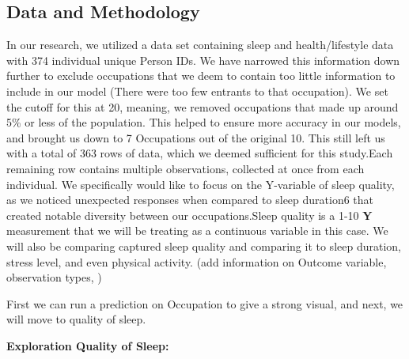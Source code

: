 \documentclass[
  letterpaper,
  DIV=11,
  numbers=noendperiod]{scrartcl}
\begin{document}
\subsection{Data and Methodology}\label{data-and-methodology}

In our research, we utilized a data set containing sleep and
health/lifestyle data with 374 individual unique Person IDs. We have
narrowed this information down further to exclude occupations that we
deem to contain too little information to include in our model (There
were too few entrants to that occupation). We set the cutoff for this at
20, meaning, we removed occupations that made up around 5\% or less of
the population. This helped to ensure more accuracy in our models, and
brought us down to 7 Occupations out of the original 10. This still left
us with a total of 363 rows of data, which we deemed sufficient for this
study.Each remaining row contains multiple observations, collected at
once from each individual. We specifically would like to focus on the
Y-variable of sleep quality, as we noticed unexpected responses when
compared to sleep duration6 that created notable diversity between our
occupations.Sleep quality is a 1-10 \textbf{Y} measurement that we will
be treating as a continuous variable in this case. We will also be
comparing captured sleep quality and comparing it to sleep duration,
stress level, and even physical activity. (add information on Outcome
variable, observation types, )

First we can run a prediction on Occupation to give a strong visual, and
next, we will move to quality of sleep.

\textbf{Exploration Quality of Sleep:}
\end{document}
